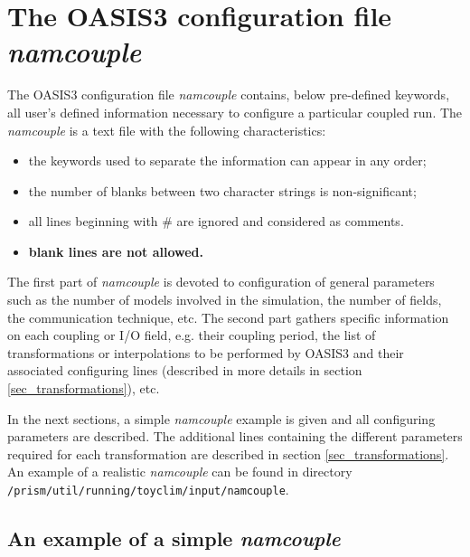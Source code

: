 \newpage
\chapter{The OASIS3 configuration file {\it namcouple}}
\label{sec_namcouple}

The OASIS3 configuration file {\em namcouple} contains, below
pre-defined keywords, all user's
defined information necessary to configure a particular coupled
run. The {\it namcouple} is a text file with the following
characteristics:

\begin{itemize}
\item the keywords used to separate the information
can appear in any order;
\item the number of blanks between two character strings is
non-significant; 
\item all lines beginning with \# are ignored and considered as
comments.
\item {\bf blank lines are not allowed.}
\end{itemize}
\vspace*{0.5cm}

The first part of {\em namcouple } is devoted to configuration of
general parameters such as the number of models involved in the
simulation, the number of fields, the communication technique, etc.
The second part gathers specific information on each coupling or I/O
field, e.g. their coupling period, the list of transformations or
interpolations to be performed by OASIS3 and their associated
configuring lines (described in more details in section
\ref{sec_transformations}), etc.

\vspace*{0.5cm}

In the next sections, a simple {\it namcouple} example is given and
all configuring parameters are described. The additional lines
containing the different parameters required for each transformation
are described in section \ref{sec_transformations}. An example of a
realistic {\em namcouple} can be found in directory 
{\tt
/prism/util/running\break/toyclim/input/namcouple}.

\section{An example of a simple {\it namcouple}}
\label{subsec_examplenamcouple}

